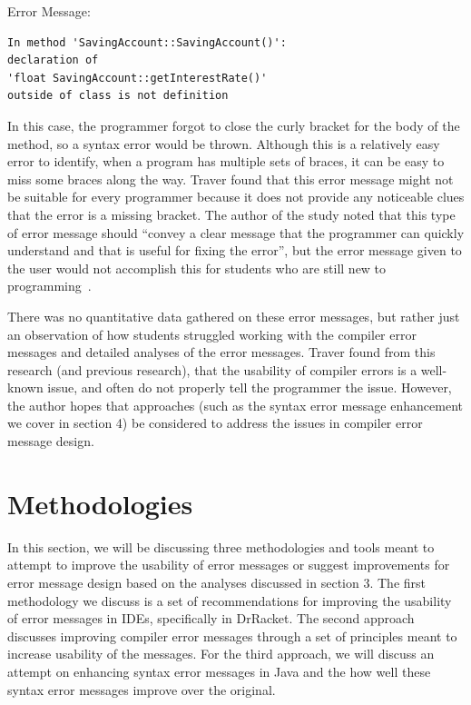\documentclass{sig-alternate}
\begin{document}
Error Message:
\begin{verbatim}
In method 'SavingAccount::SavingAccount()':
declaration of 
'float SavingAccount::getInterestRate()'
outside of class is not definition
\end{verbatim}

In this case, the programmer forgot to close the curly bracket for the body of the method, so a syntax error would be thrown.
Although this is a relatively easy error to identify, when a program has multiple sets of braces, it can be easy to miss some braces along the way.
Traver found that this error message might not be suitable for every programmer because it does not provide any noticeable clues that the error is a missing bracket.
The author of the study noted that this type of error message should ``convey a clear message that the programmer can quickly understand and that is useful for fixing the error'', but the error message given to the user would not accomplish this for students who are still new to programming~\cite{Traver:2010}.

There was no quantitative data gathered on these error messages, but rather just an observation of how students struggled working with the compiler error messages and detailed analyses of the error messages.
Traver found from this research (and previous research), that the usability of compiler errors is a well-known issue, and often do not properly tell the programmer the issue.
However, the author hopes that approaches (such as the syntax error message enhancement we cover in section 4) be considered to address the issues in compiler error message design.


\section{Methodologies}\label{sec:methodologies}
In this section, we will be discussing three methodologies and tools meant to attempt to improve the usability of error messages or suggest improvements for error message design based on the analyses discussed in section 3.
The first methodology we discuss is a set of recommendations for improving the usability of error messages in IDEs, specifically in DrRacket.
The second approach discusses improving compiler error messages through a set of principles meant to increase usability of the messages.
For the third approach, we will discuss an attempt on enhancing syntax error messages in Java and the how well these syntax error messages improve over the original. 
\end{document}
